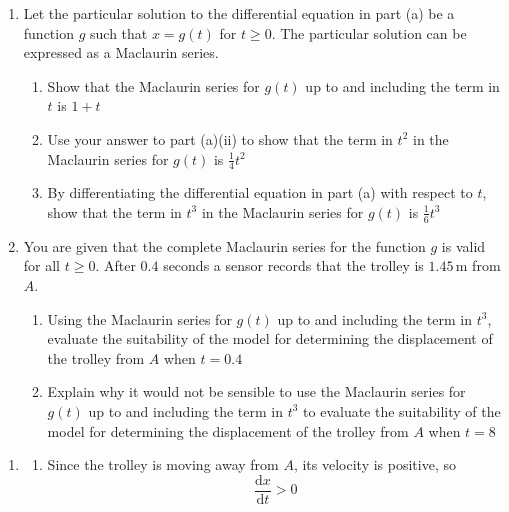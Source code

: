 \documentclass[leqno]{article}
\begin{document}
\begin{enumerate}[
  label=\textbf{\arabic*.},
  leftmargin=*,
  topsep=0pt,
  partopsep=0pt,
  parsep=0pt
]
\begin{enumerate}[label=\textbf{(\alph*)}]
\begin{enumerate}[label=(\roman*)]
  \end{enumerate}
  \item Let the particular solution to the differential equation in part (a) be a function $g$ such that $x=g(t)$ for $t\ge 0$. The particular solution can be expressed as a Maclaurin series. \\
  \begin{enumerate}[label=(\roman*)]
    \item Show that the Maclaurin series for $g(t)$ up to and including the term in $t$ is $1+t$ 
    \item Use your answer to part (a)(ii) to show that the term in $t^2$ in the Maclaurin series for $g(t)$ is $\frac{1}{4}t^2$ 
    \item By differentiating the differential equation in part (a) with respect to $t$, show that the term in $t^3$ in the Maclaurin series for $g(t)$ is $\frac{1}{6}t^3$  \\
  \end{enumerate}
  \item You are given that the complete Maclaurin series for the function $g$ is valid for all $t\ge 0$. After $0.4$ seconds a sensor records that the trolley is $1.45\,\mathrm{m}$ from $A$. \\
  \begin{enumerate}[label=(\roman*)]
    \item Using the Maclaurin series for $g(t)$ up to and including the term in $t^3$, evaluate the suitability of the model for determining the displacement of the trolley from $A$ when $t=0.4$  \\
    
    \item Explain why it would not be sensible to use the Maclaurin series for $g(t)$ up to and including the term in $t^3$ to evaluate the suitability of the model for determining the displacement of the trolley from $A$ when $t=8$  \\
  \end{enumerate}
\end{enumerate}

\vspace*{10pt}

\begin{djsSolution}
\begin{enumerate}[label=\textbf{(\alph*)}]
  \item
  \begin{enumerate}[label=(\roman*)]
    \item Since the trolley is moving away from $A$, its velocity is positive, so
    \[
    \frac{\mathrm{d}x}{\mathrm{d}t}>0
    \]


\end{enumerate}
\end{enumerate}
\end{djsSolution}
\end{enumerate}
\end{document}
